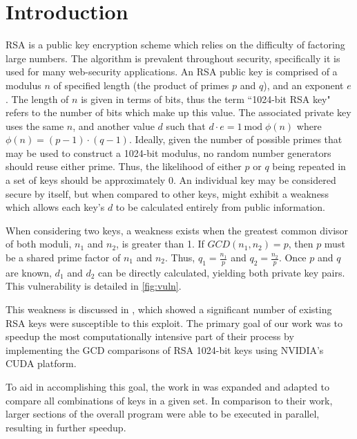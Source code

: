\documentclass[12pt]{ucthesis}
\begin{document}
\pagestyle{plain}
\renewcommand{\baselinestretch}{1.66}


\chapter{Introduction}
\label{sec:intro}

RSA is a public key encryption scheme which relies on the difficulty of 
factoring large numbers. The algorithm is prevalent throughout security, 
specifically it is used for many web-security applications. An RSA public key is 
comprised of a modulus $n$ of specified length (the product of primes $p$ and 
$q$), and an exponent $e$. The length of $n$ is given in terms of bits, thus 
the term ``1024-bit RSA key" refers to the number of bits which make up this 
value. The associated private key uses the same $n$, and another value $d$ such 
that $d \cdot e = 1 \:\text{mod} \;\phi(n)$ where $\phi(n) = (p - 1) \cdot
(q - 1)$\cite{rsa}. Ideally, given the number of possible primes that may be
used to construct a 1024-bit modulus, no random number generators should reuse
either prime. Thus, the likelihood of either $p$ or $q$ being repeated in a set
of keys should be approximately 0. An individual key may be considered secure by
itself, but when compared to other keys, might exhibit a weakness which allows
each key's $d$ to be calculated entirely from public information.

When considering two keys, a weakness exists when the greatest common 
divisor of both moduli, $n_1$ and $n_2$, is greater than 1. If $GCD(n_1, 
n_2) = p$, then $p$ must be a shared prime factor of $n_1$ and $n_2$. Thus, 
$q_1 = \frac{n_1}{p}$ and $q_2 = \frac{n_2}{p}$. Once $p$ and $q$ are known, 
$d_1$ and $d_2$ can be directly calculated, yielding both private key pairs.
This vulnerability is detailed in \ref{fig:vuln}.

This weakness is discussed in \cite{lenstra2012ron}, which showed a 
significant number of existing RSA keys were susceptible to this exploit. The 
primary goal of our work was to speedup the most computationally intensive 
part of their process by implementing the GCD comparisons of RSA 1024-bit keys 
using NVIDIA's CUDA platform.

To aid in accomplishing this goal, the work in \cite{fujimoto2009high} was 
expanded and adapted to compare all combinations of keys in a given set. In 
comparison to their work, larger sections of the overall program were able to 
be executed in parallel, resulting in further speedup.
\end{document}
